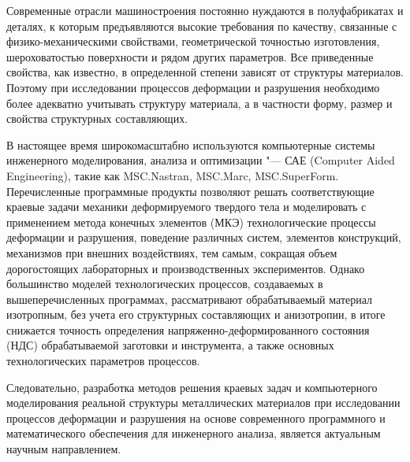 {
\small
Современные отрасли машиностроения постоянно нуждаются в полуфабрикатах и деталях, к которым предъявляются высокие требования по качеству, связанные с физико-механическими свойствами, геометрической точностью изготовления, шероховатостью поверхности и рядом других параметров. Все приведенные свойства, как известно, в определенной степени зависят от структуры материалов. Поэтому при исследовании процессов деформации и разрушения необходимо более адекватно учитывать структуру материала, а в частности форму, размер и свойства структурных составляющих.

В настоящее время широкомасштабно используются компьютерные системы инженерного моделирования, анализа и оптимизации "--- САЕ (Computer Aided Enginee\-ring), такие как MSC.Nastran, MSC.Marc, MSC.SuperForm. 
Перечисленные программные продукты позволяют решать соответствующие краевые задачи механики деформируемого твердого тела и моделировать с применением метода конечных элементов (МКЭ) технологические процессы деформации и разрушения, поведение различных систем, элементов конструкций, механизмов при внешних воздействиях, тем самым, сокращая объем дорогостоящих лабораторных и производственных экспериментов. Однако большинство моделей технологических процессов, создаваемых в вышеперечисленных программах, рассматривают обрабатываемый материал изотропным, без учета его структурных составляющих и анизотропии, в итоге снижается точность определения напряженно-деформированного состояния (НДС) обрабатываемой заготовки и инструмента, а также основных технологических параметров процессов.

Следовательно, разработка методов решения краевых задач и компьютерного моделирования реальной структуры металлических материалов при исследовании процессов деформации и разрушения на основе современного программного и математического обеспечения для инженерного анализа, является актуальным научным направлением.

}
